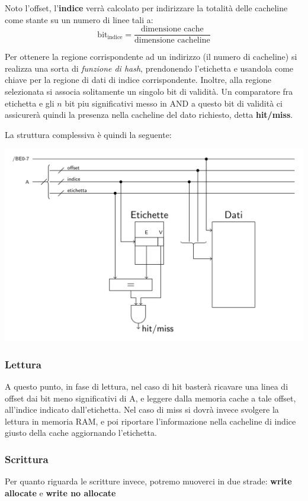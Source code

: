 \documentclass[a4paper,11pt]{article}
\begin{document}
Noto l'offset, l'\textbf{indice} verrà calcolato per indirizzare la totalità delle cacheline come stante su un numero di linee tali a:
$$
\mathrm{bit}_{\mathrm{indice}} = \frac{\text{dimensione cache}}{\text{dimensione cacheline}}
$$

Per ottenere la regione corrispondente ad un indirizzo (il numero di cacheline) si realizza una sorta di \textit{funzione di hash}, prendonendo l'etichetta e usandola come chiave per la regione di dati di indice corrispondente.
Inoltre, alla regione selezionata si associa solitamente un singolo bit di validità.
Un comparatore fra etichetta e gli $n$ bit piu significativi messo in AND a questo bit di validità ci assicurerà quindi la presenza nella cacheline del dato richiesto, detta \textbf{hit/miss}.

La struttura complessiva è quindi la seguente:
\begin{center}
	\includegraphics[scale = 0.5]{../figures/cache_diretta.png}
\end{center}

\subsubsection{Lettura}
A questo punto, in fase di lettura, nel caso di hit basterà ricavare una linea di offset dai bit meno significativi di A, e leggere dalla memoria cache a tale offset, all'indice indicato dall'etichetta.
Nel caso di miss si dovrà invece svolgere la lettura in memoria RAM, e poi riportare l'informazione nella cacheline di indice giusto della cache aggiornando l'etichetta.

\subsubsection{Scrittura}
Per quanto riguarda le scritture invece, potremo muoverci in due strade: \textbf{write allocate} e \textbf{write no allocate}
\end{document}
